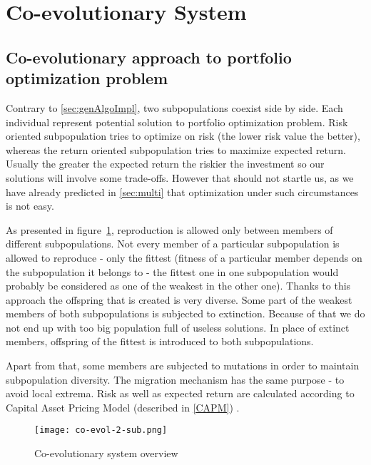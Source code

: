 \section{Co-evolutionary System}
\label{sec:co-evol-sys}

\subsection{Co-evolutionary approach to portfolio optimization problem}

Contrary to \ref{sec:genAlgoImpl}, two subpopulations coexist side by side.
Each individual represent potential solution to portfolio optimization problem.
Risk oriented subpopulation tries to optimize on risk (the lower risk value the better), whereas the return oriented subpopulation tries to maximize expected return.
Usually the greater the expected return the riskier the investment so our solutions will involve some trade-offs.
However that should not startle us, as we have already predicted in \ref{sec:multi} that optimization under such circumstances is not easy.

As presented in figure~\ref{fig:co-evol}, reproduction is allowed only between members of different subpopulations.
Not every member of a particular subpopulation is allowed to reproduce - only the fittest (fitness of a particular member depends on the subpopulation it belongs to - the fittest one
 in one subpopulation would probably be considered as one of the weakest in the other one).
Thanks to this approach the offspring that is created is very diverse. 
Some part of the weakest members of both subpopulations is subjected to extinction.
Because of that we do not end up with too big population full of useless solutions.
In place of extinct members, offspring of the fittest is introduced to both subpopulations.

Apart from that, some members are subjected to mutations in order to maintain subpopulation diversity.
The migration mechanism has the same purpose - to avoid local extrema.
Risk as well as expected return are calculated according to Capital Asset Pricing Model (described in \ref{CAPM}) .


\begin{figure}[H]  
	    \begin{center}
	      \texttt{[image: co-evol-2-sub.png]}
	    \end{center}
	    \caption{Co-evolutionary system overview} 
	    \label{fig:co-evol}
	  \end{figure}


